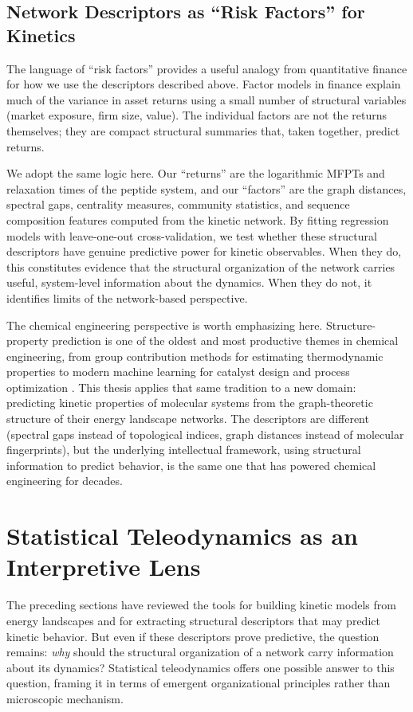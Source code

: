 \subsection{Network Descriptors as ``Risk Factors'' for Kinetics}

The language of ``risk factors'' provides a useful analogy from quantitative
finance for how we use the descriptors described above. Factor models in
finance explain much of the variance in asset returns using a small number of
structural variables (market exposure, firm size, value). The individual
factors are not the returns themselves; they are compact structural summaries
that, taken together, predict returns.

We adopt the same logic here. Our ``returns'' are the logarithmic MFPTs and
relaxation times of the peptide system, and our ``factors'' are the graph
distances, spectral gaps, centrality measures, community statistics, and
sequence composition features computed from the kinetic network. By fitting
regression models with leave-one-out cross-validation, we test whether these
structural descriptors have genuine predictive power for kinetic observables.
When they do, this constitutes evidence that the structural organization of the
network carries useful, system-level information about the dynamics. When they
do not, it identifies limits of the network-based perspective.

The chemical engineering perspective is worth emphasizing here. Structure-property
prediction is one of the oldest and most productive themes in chemical
engineering, from group contribution methods for estimating thermodynamic
properties to modern machine learning for catalyst design and process
optimization \cite{Venkatasubramanian2003QSPR}. This thesis applies that same
tradition to a new domain: predicting kinetic properties of molecular systems
from the graph-theoretic structure of their energy landscape networks. The
descriptors are different (spectral gaps instead of topological indices, graph
distances instead of molecular fingerprints), but the underlying intellectual
framework, using structural information to predict behavior, is the same one
that has powered chemical engineering for decades.


\section{Statistical Teleodynamics as an Interpretive Lens}\label{sec:stat_teleo_lit}

The preceding sections have reviewed the tools for building kinetic models from energy landscapes and for extracting structural descriptors that may predict kinetic behavior. But even if these descriptors prove predictive, the question remains: \emph{why} should the structural organization of a network carry information about its dynamics? Statistical teleodynamics offers one possible answer to this question, framing it in terms of emergent organizational principles rather than microscopic mechanism.

